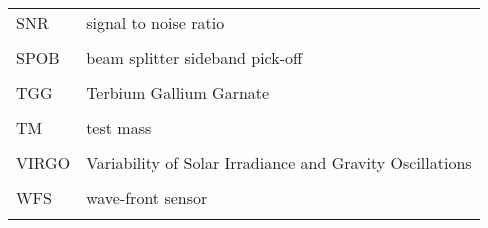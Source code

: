 \singlespacing
\begin{tabular}{lp{5in}}
SNR & signal to noise ratio \\
\\
SPOB & beam splitter sideband pick-off \\
\\
TGG & Terbium Gallium Garnate \\
\\
TM & test mass \\
\\
VIRGO & Variability of Solar Irradiance and Gravity Oscillations \\
\\
WFS & wave-front sensor \\
\\
\end{tabular}
\doublespacing

